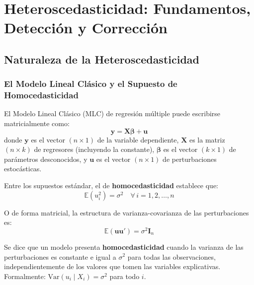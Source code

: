 \documentclass[12pt,a4paper]{report}
\theoremstyle{definition}
\theoremstyle{remark}
\newcommand{\E}{\mathbb{E}}
\newcommand{\Var}{\mathrm{Var}}
\begin{document}
\tableofcontents


\chapter{Heteroscedasticidad: Fundamentos, Detección y Corrección}

\section{Naturaleza de la Heteroscedasticidad}

\subsection{El Modelo Lineal Clásico y el Supuesto de Homocedasticidad}

El Modelo Lineal Clásico (MLC) de regresión múltiple puede escribirse matricialmente como:
\begin{equation}
  \mathbf{y} = \mathbf{X}\boldsymbol{\beta} + \mathbf{u}
  \label{eq:mlc}
\end{equation}
donde $\mathbf{y}$ es el vector $(n \times 1)$ de la variable dependiente, $\mathbf{X}$ es la matriz $(n \times k)$ de regresores (incluyendo la constante), $\boldsymbol{\beta}$ es el vector $(k \times 1)$ de parámetros desconocidos, y $\mathbf{u}$ es el vector $(n \times 1)$ de perturbaciones estocásticas.

Entre los supuestos estándar, el de \textbf{homocedasticidad} establece que:
\begin{equation}
  \E(u_i^2) = \sigma^2 \quad \forall\, i = 1, 2, \ldots, n
  \label{eq:homo}
\end{equation}

O de forma matricial, la estructura de varianza-covarianza de las perturbaciones es:
\begin{equation}
  \E(\mathbf{u}\mathbf{u}') = \sigma^2 \mathbf{I}_n
  \label{eq:homo_matricial}
\end{equation}

\begin{tcolorbox}[defstyle, title={Definición 11.1: Homocedasticidad}]
  Se dice que un modelo presenta \textbf{homocedasticidad} cuando la varianza de las perturbaciones es constante e igual a $\sigma^2$ para todas las observaciones, independientemente de los valores que tomen las variables explicativas. Formalmente: $\Var(u_i \mid X_i) = \sigma^2$ para todo $i$.
\end{tcolorbox}
\end{document}
